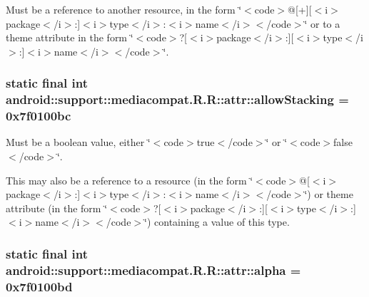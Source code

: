Must be a reference to another resource, in the form \char`\"{}$<$code$>$@\mbox{[}+\mbox{]}\mbox{[}$<$i$>$package$<$/i$>$:\mbox{]}$<$i$>$type$<$/i$>$:$<$i$>$name$<$/i$>$$<$/code$>$\char`\"{} or to a theme attribute in the form \char`\"{}$<$code$>$?\mbox{[}$<$i$>$package$<$/i$>$:\mbox{]}\mbox{[}$<$i$>$type$<$/i$>$:\mbox{]}$<$i$>$name$<$/i$>$$<$/code$>$\char`\"{}. \hypertarget{classandroid_1_1support_1_1mediacompat_1_1_r_1_1attr_3e6788d1efb6d07a91b1692e0832a8aa}{
\subsubsection[{allowStacking}]{\setlength{\rightskip}{0pt plus 5cm}static final int android::support::mediacompat.R.R::attr::allowStacking = 0x7f0100bc}}
\label{classandroid_1_1support_1_1mediacompat_1_1_r_1_1attr_3e6788d1efb6d07a91b1692e0832a8aa}


Must be a boolean value, either \char`\"{}$<$code$>$true$<$/code$>$\char`\"{} or \char`\"{}$<$code$>$false$<$/code$>$\char`\"{}. 

This may also be a reference to a resource (in the form \char`\"{}$<$code$>$@\mbox{[}$<$i$>$package$<$/i$>$:\mbox{]}$<$i$>$type$<$/i$>$:$<$i$>$name$<$/i$>$$<$/code$>$\char`\"{}) or theme attribute (in the form \char`\"{}$<$code$>$?\mbox{[}$<$i$>$package$<$/i$>$:\mbox{]}\mbox{[}$<$i$>$type$<$/i$>$:\mbox{]}$<$i$>$name$<$/i$>$$<$/code$>$\char`\"{}) containing a value of this type. \hypertarget{classandroid_1_1support_1_1mediacompat_1_1_r_1_1attr_590dc0525eb4be69e84f51decdda06a2}{
\subsubsection[{alpha}]{\setlength{\rightskip}{0pt plus 5cm}static final int android::support::mediacompat.R.R::attr::alpha = 0x7f0100bd}}
\label{classandroid_1_1support_1_1mediacompat_1_1_r_1_1attr_590dc0525eb4be69e84f51decdda06a2}


